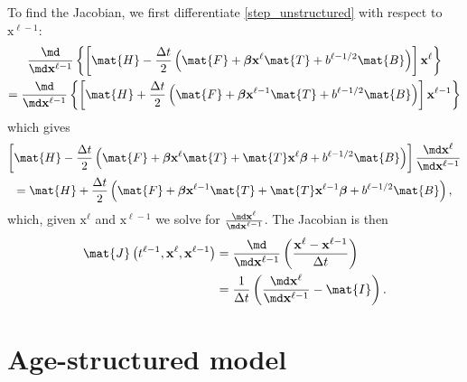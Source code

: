 \documentclass{jpmarticle}
\renewcommand{\vec}[1]{\boldsymbol{\mathrm{#1}}}
\begin{document}
To find the Jacobian, we first differentiate \eqref{step_unstructured}
with respect to $\vec{x}^{\ell - 1}$:
\begin{multline}
  \frac{\md}{\md \vec{x}^{\ell - 1}}
  \left\{
    \left[
      \mat{H}
      - \frac{\Delta t}{2}
      \left(
        \mat{F}
        + \vec{\beta} \vec{x}^{\ell} \mat{T}
        + b^{\ell - 1 / 2} \mat{B}
      \right)
    \right]
    \vec{x}^{\ell}
  \right\}
  \\
  = \frac{\md}{\md \vec{x}^{\ell - 1}}
  \left\{
    \left[
      \mat{H}
      + \frac{\Delta t}{2}
      \left(
        \mat{F}
        + \vec{\beta} \vec{x}^{\ell - 1} \mat{T}
        + b^{\ell - 1 / 2} \mat{B}
      \right)
    \right]
    \vec{x}^{\ell - 1}
  \right\}
\end{multline}
which gives
\begin{multline}
  \left[
    \mat{H}
    - \frac{\Delta t}{2}
    \left(
      \mat{F}
      + \vec{\beta} \vec{x}^{\ell} \mat{T}
      + \mat{T} \vec{x}^{\ell} \vec{\beta}
      + b^{\ell - 1 / 2} \mat{B}
    \right)
  \right]
  \frac{\md \vec{x}^{\ell}}{\md \vec{x}^{\ell - 1}}
  \\
  = \mat{H}
  + \frac{\Delta t}{2}
  \left(
    \mat{F}
    + \vec{\beta} \vec{x}^{\ell - 1} \mat{T}
    + \mat{T} \vec{x}^{\ell - 1} \vec{\beta}
    + b^{\ell - 1 / 2} \mat{B}
  \right),
\end{multline}
which, given $\vec{x}^{\ell}$
and $\vec{x}^{\ell - 1}$
we solve for $\frac{\md \vec{x}^{\ell}}{\md \vec{x}^{\ell - 1}}$.
The Jacobian is then
\begin{equation}
  \begin{split}
    \mat{J}\left(t^{\ell - 1}, \vec{x}^{\ell}, \vec{x}^{\ell - 1}\right)
    &= \frac{\md}{\md \vec{x}^{\ell - 1}}
    \left(
      \frac{\vec{x}^{\ell} - \vec{x}^{\ell - 1}}{\Delta t}
    \right)
    \\
    &= \frac{1}{\Delta t} \left(
      \frac{\md \vec{x}^{\ell}}{\md \vec{x}^{\ell - 1}}
      - \mat{I}
    \right).
  \end{split}
\end{equation}


\section{Age-structured model}
\end{document}
